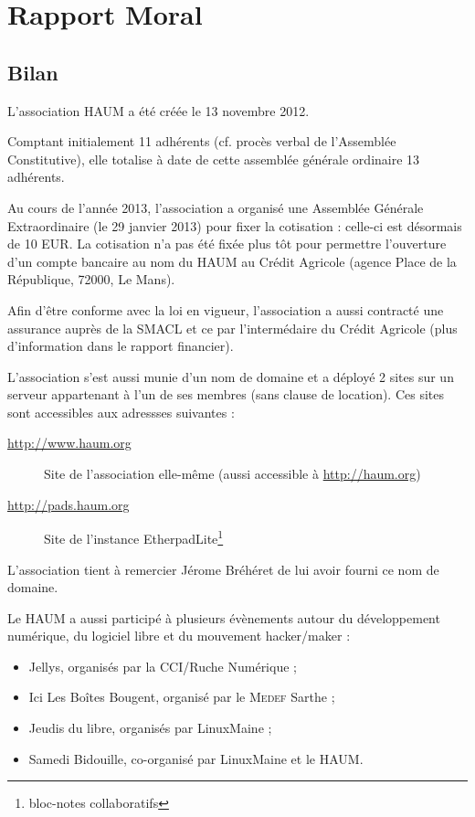 \documentclass[11pt]{article}
\begin{document}
\section{Rapport Moral}

\subsection{Bilan}

L'association HAUM a été créée le 13 novembre 2012.

Comptant initialement 11 adhérents (cf. procès verbal de l'Assemblée Constitutive), elle totalise à date de cette
assemblée générale ordinaire 13 adhérents.

Au cours de l'année 2013, l'association a organisé une Assemblée Générale Extraordinaire (le 29 janvier 2013) pour fixer
la cotisation : celle-ci est désormais de 10 EUR. La cotisation n'a pas été fixée plus tôt pour permettre l'ouverture d'un
compte bancaire au nom du HAUM au Crédit Agricole (agence Place de la République, 72000, Le Mans).

Afin d'être conforme avec la loi en vigueur, l'association a aussi contracté une assurance auprès de la SMACL et ce par
l'intermédaire du Crédit Agricole (plus d'information dans le rapport financier).

L'association s'est aussi munie d'un nom de domaine et a déployé 2 sites sur un serveur appartenant à l'un de ses
membres (sans clause de location). Ces sites sont accessibles aux adressses suivantes :

\begin{description}
    \item[\url{http://www.haum.org}] Site de l'association elle-même (aussi accessible à \url{http://haum.org})
    \item[\url{http://pads.haum.org}] Site de l'instance EtherpadLite\footnote{bloc-notes collaboratifs}
\end{description}

L'association tient à remercier Jérome Bréhéret de lui avoir fourni ce nom de domaine.

Le HAUM a aussi participé à plusieurs évènements autour du développement numérique, du logiciel libre et du mouvement
hacker/maker :

\begin{itemize}
    \item Jellys, organisés par la CCI/Ruche Numérique ;
    \item Ici Les Boîtes Bougent, organisé par le \textsc{Medef} Sarthe ;
    \item Jeudis du libre, organisés par LinuxMaine ;
    \item Samedi Bidouille, co-organisé par LinuxMaine et le HAUM.
\end{itemize}
\end{document}
